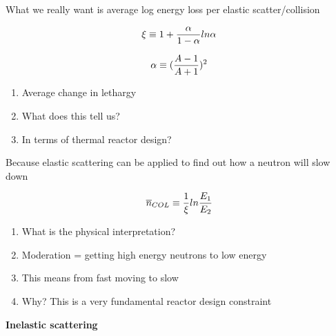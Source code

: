 \documentclass[aspectratio=1610,pdftex,dvipsnames,compress,xcolor={dvipsnames}]{beamer}
\begin{document}
\begin{frame}{What we really want is average log energy loss per elastic scatter/collision}

    \begin{equation}
        \LARGE
        \xi \equiv 1 + \frac{\alpha}{1 - \alpha}ln \alpha
    \end{equation}

    \begin{equation}
        \LARGE
        \alpha \equiv (\frac{A - 1}{A + 1})^2
    \end{equation}

    \vspace*{\fill}

    \begin{enumerate}[series=outerlist,topsep=0pt,itemsep=21pt,leftmargin=*,label=(\arabic*)]
        \item[]Average change in lethargy
        \item[]What does this tell us?
        \item[]In terms of thermal reactor design?
    \end{enumerate}
\end{frame}


\begin{frame}{Because elastic scattering can be applied to find out how a neutron will slow down}

    \begin{equation}
        \LARGE
        \overline{n}_{COL} \equiv \frac{1}{\xi} ln \frac{E_1}{E_2}
    \end{equation}

    \vspace*{\fill}

    \begin{enumerate}[series=outerlist,topsep=0pt,itemsep=21pt,leftmargin=*,label=(\arabic*)]
        \item[]What is the physical interpretation?
        \item[]Moderation = getting high energy neutrons to low energy
        \item[]This means from fast moving to slow
        \item[]Why? This is a very fundamental reactor design constraint
    \end{enumerate}
\end{frame}


\begin{frame}[plain]{}
    \centering\LARGE\textbf{Inelastic scattering}
\end{frame}
\end{document}

